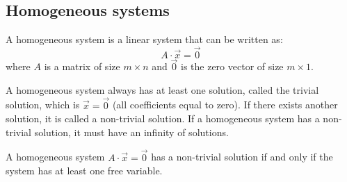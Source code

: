 \subsection{Homogeneous systems}
\begin{definition}
    A homogeneous system is a linear system that can be written as:
    \[
        A \cdot \vec{x} = \vec{0}
    \]
    where $A$ is a matrix of size $m \times n$ and $\vec{0}$ is the zero vector of size $m \times 1$.
\end{definition}
A homogeneous system always has at least one solution, called the trivial solution, which is $\vec{x} = \vec{0}$ (all coefficients equal to zero). If there exists another solution, it is called a non-trivial solution. If a homogeneous system has a non-trivial solution, it must have an infinity of solutions.
\begin{theorem}
    A homogeneous system $A \cdot \vec{x} = \vec{0}$ has a non-trivial solution if and only if the system has at least one free variable.
\end{theorem}